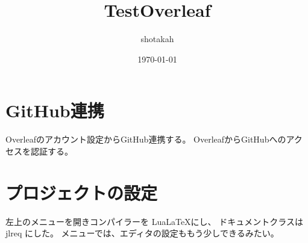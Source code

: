 \documentclass{jlreq}
\title{TestOverleaf}
\author{shotakah}
\date{\today}
\begin{document}
\maketitle

\section{GitHub連携}

Overleafのアカウント設定からGitHub連携する。
OverleafからGitHubへのアクセスを認証する。

\section{プロジェクトの設定}

左上のメニューを開きコンパイラーを Lua\LaTeX にし、
ドキュメントクラスは jlreq にした。
メニューでは、エディタの設定ももう少しできるみたい。
\end{document}
